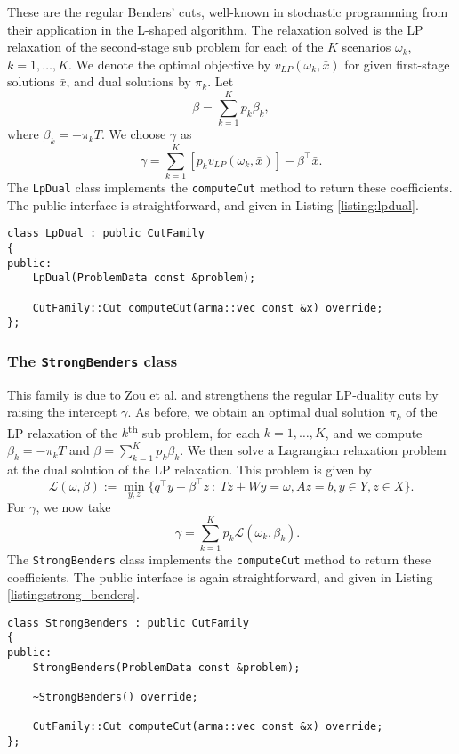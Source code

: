 \documentclass[12pt, english]{article}
\begin{document}
These are the regular Benders' cuts, well-known in stochastic programming from their application in the L-shaped algorithm. The relaxation solved is the LP relaxation of the second-stage sub problem for each of the $K$ scenarios $\omega_k$, $k = 1,\ldots,K$. We denote the optimal objective by $v_{LP}(\omega_k, \bar x)$ for given first-stage solutions $\bar x$, and dual solutions by $\pi_k$. Let
\[ \beta = \sum_{k = 1}^K p_k \beta_k,\]
where $\beta_k = -\pi_k T$.
We choose $\gamma$ as
\begin{equation}
\gamma = \sum_{k = 1}^K \left[ p_k v_{LP}(\omega_k, \bar x) \right] - \beta^\top \bar x.
\label{eq:benders_coeffs}
\end{equation}
The \texttt{LpDual} class implements the \texttt{computeCut} method to return these coefficients. The public interface is straightforward, and given in Listing \ref{listing:lpdual}.
\begin{lstlisting}[caption={Public interface of the \texttt{LpDual} class.}, 
                   label={listing:lpdual}]
class LpDual : public CutFamily
{
public:
	LpDual(ProblemData const &problem);
	
	CutFamily::Cut computeCut(arma::vec const &x) override;
};
\end{lstlisting}

\subsubsection{The \texttt{StrongBenders} class}
\label{subsubsec:strong_benders}

This family is due to Zou et al. \cite{zou2019} and strengthens the regular LP-duality cuts by raising the intercept $\gamma$. As before, we obtain an optimal dual solution $\pi_k$ of the LP relaxation of the $k$\textsuperscript{th} sub problem, for each $k = 1,\ldots,K$, and we compute $\beta_k = -\pi_k T$ and $\beta = \sum_{k = 1}^K p_k \beta_k$. We then solve a Lagrangian relaxation problem at the dual solution of the LP relaxation. This problem is given by
\[ \mathcal{L}(\omega, \beta) := \min_{y, z} \{ q^\top y - \beta^\top z~:~Tz + Wy = \omega, Az = b, y \in Y, z \in X \}. \]
For $\gamma$, we now take
\begin{equation}
\quad \gamma = \sum_{k = 1}^K p_k \mathcal{L}(\omega_k, \beta_k).
\label{eq:strong_benders_coeffs}
\end{equation}
The \texttt{StrongBenders} class implements the \texttt{computeCut} method to return these coefficients. The public interface is again straightforward, and given in Listing \ref{listing:strong_benders}.
\begin{lstlisting}[caption={Public interface of the \texttt{StrongBenders} class.}, 
                   label={listing:strong_benders}]
class StrongBenders : public CutFamily
{
public:
	StrongBenders(ProblemData const &problem);
	
	~StrongBenders() override;
	
	CutFamily::Cut computeCut(arma::vec const &x) override;
};
\end{lstlisting}
\end{document}
